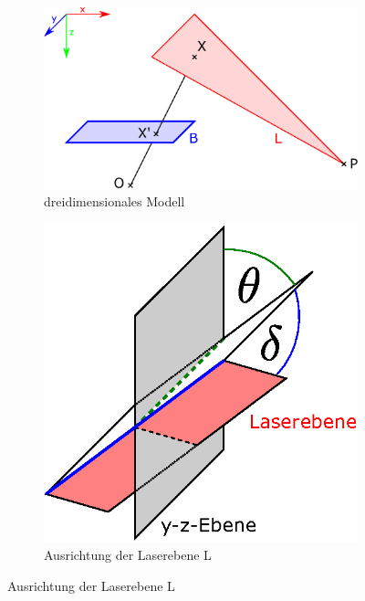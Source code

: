 \documentclass[ngerman,a4paper,parskip=half]{scrartcl}
\begin{document}
\begin{figure}
	\centering
	\begin{subfigure}{0.55\textwidth}
		\includegraphics[width=\textwidth]{includes/triangulation3d}
		\caption{dreidimensionales Modell}
		\label{fig:triangulation3d}
	\end{subfigure}
	\hfill
	\begin{subfigure}{0.35\textwidth}
		\includegraphics[width=\textwidth]{includes/triangulation_skew_pitch}
		\caption{Ausrichtung der Laserebene L}
		\label{fig:triangulation_skew_pitch}
	\end{subfigure}


\end{figure}
\end{document}

